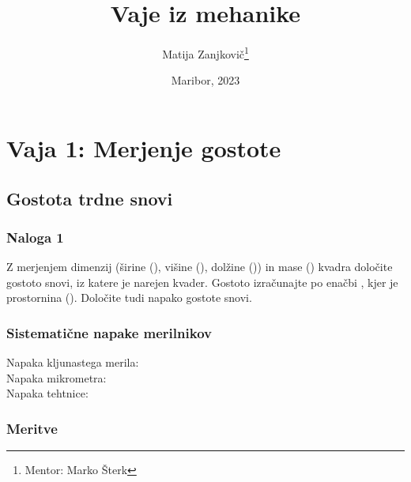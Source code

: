 \documentclass{report}
\title{Vaje iz mehanike}
\author{Matija Zanjkovič\thanks{Mentor: Marko Šterk}}
\date{Maribor, 2023}
\begin{document}
\maketitle
\thispagestyle{empty}

\null\newpage

\thispagestyle{empty}
\tableofcontents

\listoftables

\thispagestyle{empty}

\clearpage  %



\setcounter{page}{1}  %

\chapter{Vaja 1: Merjenje gostote}
\section{Gostota trdne snovi}
\subsection{Naloga 1}
Z merjenjem dimenzij (širine (), višine (), dolžine ()) in mase () kvadra določite gostoto \bm{(\rho)} snovi, iz katere je narejen kvader. 
Gostoto izračunajte po enačbi , kjer je  prostornina (). Določite tudi napako gostote snovi.
\subsection{Sistematične napake merilnikov}
Napaka kljunastega merila: \\
Napaka mikrometra: \\
Napaka tehtnice: \\

\subsection{Meritve}
\end{document}
